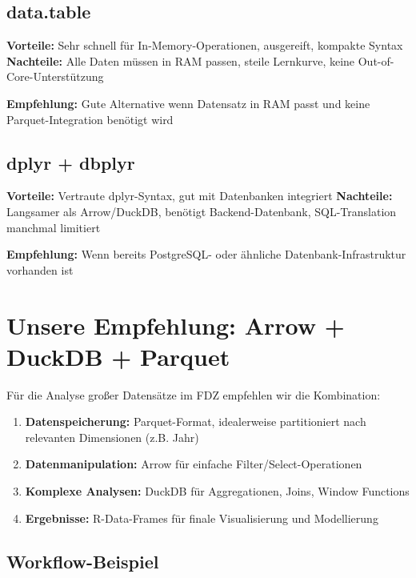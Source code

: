\documentclass[
  ngerman,
  10pt,
  letterpaper,
  twocolumn]{book}
\providecommand{\tightlist}{%
  \setlength{\itemsep}{0pt}\setlength{\parskip}{0pt}}
\begin{document}
\subsection{data.table}\label{data.table}

\textbf{Vorteile:} Sehr schnell für In-Memory-Operationen, ausgereift,
kompakte Syntax \textbf{Nachteile:} Alle Daten müssen in RAM passen,
steile Lernkurve, keine Out-of-Core-Unterstützung

\textbf{Empfehlung:} Gute Alternative wenn Datensatz in RAM passt und
keine Parquet-Integration benötigt wird

\subsection{dplyr + dbplyr}\label{dplyr-dbplyr}

\textbf{Vorteile:} Vertraute dplyr-Syntax, gut mit Datenbanken
integriert \textbf{Nachteile:} Langsamer als Arrow/DuckDB, benötigt
Backend-Datenbank, SQL-Translation manchmal limitiert

\textbf{Empfehlung:} Wenn bereits PostgreSQL- oder ähnliche
Datenbank-Infrastruktur vorhanden ist

\section{Unsere Empfehlung: Arrow + DuckDB +
Parquet}\label{unsere-empfehlung-arrow-duckdb-parquet}

Für die Analyse großer Datensätze im FDZ empfehlen wir die Kombination:

\begin{enumerate}
\def\labelenumi{\arabic{enumi}.}
\tightlist
\item
  \textbf{Datenspeicherung:} Parquet-Format, idealerweise partitioniert
  nach relevanten Dimensionen (z.B. Jahr)
\item
  \textbf{Datenmanipulation:} Arrow für einfache
  Filter/Select-Operationen
\item
  \textbf{Komplexe Analysen:} DuckDB für Aggregationen, Joins, Window
  Functions
\item
  \textbf{Ergebnisse:} R-Data-Frames für finale Visualisierung und
  Modellierung
\end{enumerate}

\subsection{Workflow-Beispiel}\label{workflow-beispiel}
\end{document}
